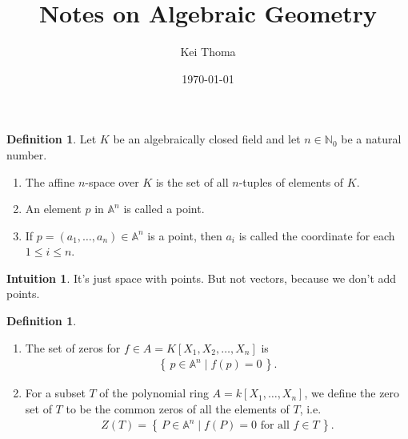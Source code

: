 \documentclass[11pt]{book}
\title{Notes on Algebraic Geometry}
\author{Kei Thoma}
\date{\today}
\theoremstyle{definition}
\newtheorem{definition}[theorem]{Definition}
\newtheorem{intuition}[theorem]{Intuition}
\numberwithin{equation}{section}
\newcommand{\makeset}[2]{\left\{\, #1 \mathrel{\mid} #2 \,\right\}}
\begin{document}
\maketitle
\tableofcontents

\cite{hartshorne1977}
\newpage
\begin{defbox}
    \begin{definition}
        Let \(K\) be an algebraically closed field and let \(n \in \mathbb{N}_0\) be a natural number.
        \begin{enumerate}
            \item The affine \(n\)-space over \(K\) is the set of all \(n\)-tuples of elements of \(K\).
            \item An element \(p\) in \(\mathbb{A}^n\) is called a point.
            \item If \(p = (a_1, \ldots, a_n) \in \mathbb{A}^n\) is a point, then \(a_i\) is called the coordinate for each \(1 \leq i \leq n\).
        \end{enumerate}
    \end{definition}
\end{defbox}

\begin{intbox}
\begin{intuition}
It's just space with points. But not vectors, because we don't add points.
\end{intuition}
\end{intbox}

\begin{defbox}
    \begin{definition}
        \begin{enumerate}
            \item The set of zeros for \(f \in A = K[X_1, X_2, \ldots, X_n]\) is
            \begin{align*}
                \makeset{p \in \mathbb{A}^n}{f(p) = 0}\text{.}
            \end{align*}
        
            \item For a subset \(T\) of the polynomial ring \(A = k[X_1, \ldots, X_n]\), we define the zero set of \(T\) to be the common zeros of all the elements of \(T\), i.e.
            \begin{align*}
                Z(T) = \makeset{P \in \mathbb{A}^n}{f(P) = 0 \text{ for all } f \in T} \text{.}
            \end{align*}
        \end{enumerate}
    \end{definition}
\end{defbox}
\end{document}
